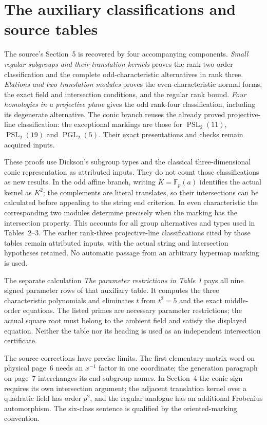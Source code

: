 \documentclass[11pt]{article}
\newcommand{\F}{\mathbb F}\newcommand{\PSL}{\operatorname{PSL}}\newcommand{\PSU}{\operatorname{PSU}}
\begin{document}
\section*{The auxiliary classifications and source tables}
The source's Section~5 is recovered by four accompanying components.
\emph{Small regular subgroups and their translation kernels} proves the
rank-two order classification and the complete odd-characteristic
alternatives in rank three. \emph{Elations and two translation modules}
proves the even-characteristic normal forms, the exact field and
intersection conditions, and the regular rank bound.
\emph{Four homologies in a projective plane} gives the odd rank-four
classification, including its degenerate alternative. The conic branch
reuses the already proved projective-line classification: the exceptional
markings are those for $\PSL_2(11)$, $\PSL_2(19)$ and $\operatorname{PGL}_2(5)$.
Their exact presentations and checks remain acquired inputs.

These proofs use Dickson's subgroup types and the classical
three-dimensional conic representation as attributed inputs. They do
not count those classifications as new results. In the odd affine
branch, writing $K=\F_p(a)$ identifies the actual kernel as $K^2$;
the complements are literal translates, so their intersections can be
calculated before appealing to the string end criterion. In even
characteristic the corresponding two modules determine precisely when
the marking has the intersection property. This accounts for all group
alternatives and types used in Tables~2--3. The earlier rank-three
projective-line classifications cited by those tables remain attributed
inputs, with the actual string and intersection hypotheses retained.
No automatic passage from an arbitrary hypermap marking is used.

The separate calculation \emph{The parameter restrictions in Table 1}
pays all nine signed parameter rows of that auxiliary table. It computes
the three characteristic polynomials and eliminates $t$ from $t^2=5$
and the exact middle-order equations. The listed primes are necessary
parameter restrictions; the actual square root must belong to the
ambient field and satisfy the displayed equation. Neither the table
nor its heading is used as an independent intersection certificate.

The source corrections have precise limits. The first elementary-matrix
word on physical page~6 needs an $x^{-1}$ factor in one coordinate;
the generation paragraph on page~7 interchanges its end-subgroup names.
In Section~4 the conic sign requires its own intersection argument; the
adjacent translation kernel over a quadratic field has order $p^2$,
and the regular analogue has an additional Frobenius automorphism.
The six-class sentence is qualified by the oriented-marking convention.
\end{document}
